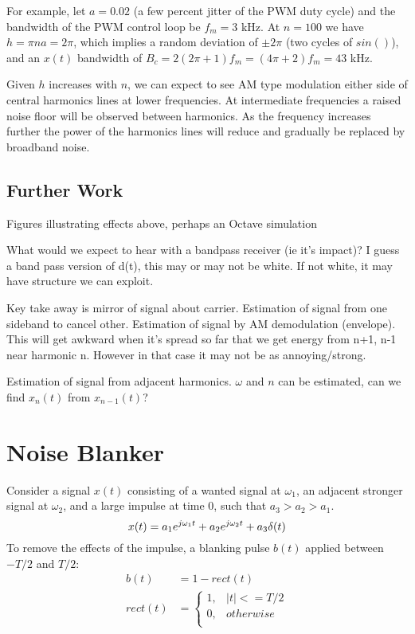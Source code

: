\documentclass{article}
\begin{document}
For example, let $a=0.02$ (a few percent jitter of the PWM duty cycle) and the bandwidth of the PWM control loop be $f_m=3$ kHz. At $n=100$ we have $h=\pi n a = 2\pi$, which implies a random deviation of $\pm 2\pi$ (two cycles of $sin()$), and an $x(t)$ bandwidth of $B_c=2(2 \pi+1)f_m = (4\pi+2)f_m = 43$ kHz.

Given $h$ increases with $n$, we can expect to see AM type modulation either side of central harmonics lines at lower frequencies.  At intermediate frequencies a raised noise floor will be observed between harmonics.  As the frequency increases further the power of the harmonics lines will reduce and gradually be replaced by broadband noise.

\subsection{Further Work}

Figures illustrating effects above, perhaps an Octave simulation

What would we expect to hear with a bandpass receiver (ie it's impact)?  I guess a band pass version of d(t), this may or may not be white.  If not white, it may have structure we can exploit.

Key take away is mirror of signal about carrier. Estimation of signal from one sideband to cancel other.  Estimation of signal by AM demodulation (envelope). This will get awkward when it's spread so far that we get energy from n+1, n-1 near harmonic n.  However in that case it may not be as annoying/strong.

Estimation of signal from adjacent harmonics.  $\omega$ and $n$ can be estimated, can we find $x_n(t)$ from $x_{n-1}(t)$?

\section{Noise Blanker}

Consider a signal $x(t)$ consisting of a wanted signal at $\omega_1$, an adjacent stronger signal at $\omega_2$, and a large impulse at time 0, such that $a_3>a_2>a_1$.
\begin{equation}
x(t) = a_1 e^{j \omega_1 t} + a_2 e^{j \omega_2 t} + a_3\delta(t) \\
\end{equation}
To remove the effects of the impulse, a blanking pulse $b(t)$ applied between $-T/2$ and $T/2$:
\begin{equation}
\begin{split}
b(t) &= 1 - rect(t) \\
rect(t) &= 
	\begin{cases}
      1, & |t| <= T/2 \\
      0, & otherwise \\
	\end{cases}
\end{split}
\end{equation} 
\end{document}
